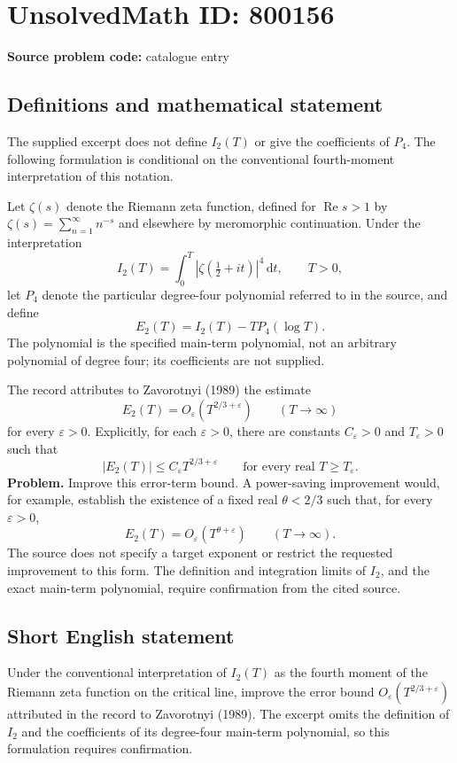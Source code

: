 \documentclass[11pt]{article}
\begin{document}
\section*{UnsolvedMath ID: 800156}
\textbf{Source problem code:} catalogue entry
\subsection{Definitions and mathematical statement}
The supplied excerpt does not define \(I_2(T)\) or give the coefficients of \(P_4\). The following formulation is conditional on the conventional fourth-moment interpretation of this notation.

Let \(\zeta(s)\) denote the Riemann zeta function, defined for \(\operatorname{Re}s>1\) by \(\zeta(s)=\sum_{n=1}^{\infty}n^{-s}\) and elsewhere by meromorphic continuation. Under the interpretation
\[
I_2(T)=\int_0^T\left|\zeta\!\left(\tfrac12+it\right)\right|^4\,\mathrm{d}t,\qquad T>0,
\]
let \(P_4\) denote the particular degree-four polynomial referred to in the source, and define
\[
E_2(T)=I_2(T)-T P_4(\log T).
\]
The polynomial is the specified main-term polynomial, not an arbitrary polynomial of degree four; its coefficients are not supplied.

The record attributes to Zavorotnyi (1989) the estimate
\[
E_2(T)=O_{\varepsilon}\!\left(T^{2/3+\varepsilon}\right)
\qquad(T\to\infty)
\]
for every \(\varepsilon>0\). Explicitly, for each \(\varepsilon>0\), there are constants \(C_{\varepsilon}>0\) and \(T_{\varepsilon}>0\) such that
\[
|E_2(T)|\le C_{\varepsilon}T^{2/3+\varepsilon}
\qquad\text{for every real }T\ge T_{\varepsilon}.
\]
\textbf{Problem.} Improve this error-term bound. A power-saving improvement would, for example, establish the existence of a fixed real \(\theta<2/3\) such that, for every \(\varepsilon>0\),
\[
E_2(T)=O_{\varepsilon}\!\left(T^{\theta+\varepsilon}\right)
\qquad(T\to\infty).
\]
The source does not specify a target exponent or restrict the requested improvement to this form. The definition and integration limits of \(I_2\), and the exact main-term polynomial, require confirmation from the cited source.
\subsection{Short English statement}
Under the conventional interpretation of \(I_2(T)\) as the fourth moment of the Riemann zeta function on the critical line, improve the error bound \(O_{\varepsilon}(T^{2/3+\varepsilon})\) attributed in the record to Zavorotnyi (1989). The excerpt omits the definition of \(I_2\) and the coefficients of its degree-four main-term polynomial, so this formulation requires confirmation.
\end{document}
